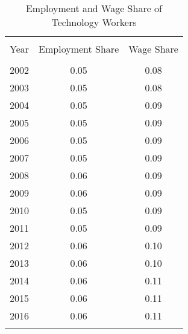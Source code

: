 
\begin{table}[!htbp] \centering 
  \caption{Employment and Wage Share of Technology Workers} 
  \label{tab:tab_industry_tech_share} 
\begin{tabular}{@{\extracolsep{5pt}} ccc} 
\\[-1.8ex]\hline 
\hline \\[-1.8ex] 
Year & Employment Share & Wage Share \\ 
\hline \\[-1.8ex] 
2002 & 0.05 & 0.08 \\ 
2003 & 0.05 & 0.08 \\ 
2004 & 0.05 & 0.09 \\ 
2005 & 0.05 & 0.09 \\ 
2006 & 0.05 & 0.09 \\ 
2007 & 0.05 & 0.09 \\ 
2008 & 0.06 & 0.09 \\ 
2009 & 0.06 & 0.09 \\ 
2010 & 0.05 & 0.09 \\ 
2011 & 0.05 & 0.09 \\ 
2012 & 0.06 & 0.10 \\ 
2013 & 0.06 & 0.10 \\ 
2014 & 0.06 & 0.11 \\ 
2015 & 0.06 & 0.11 \\ 
2016 & 0.06 & 0.11 \\ 
\hline \\[-1.8ex] 
\end{tabular} 
\end{table} 
